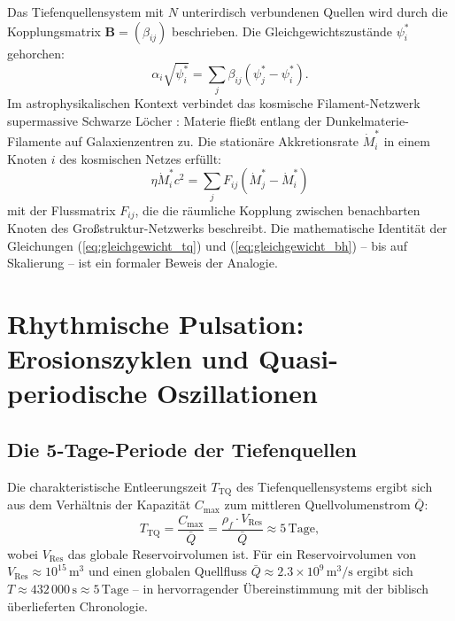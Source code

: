 ﻿\documentclass[12pt,a4paper]{report}
\begin{document}
Das Tiefenquellensystem mit $N$ unterirdisch verbundenen Quellen wird durch die Kopplungsmatrix $\mathbf{B} = (\beta_{ij})$ beschrieben. Die Gleichgewichtszustände $\psi_i^*$ gehorchen:
\begin{equation}
	\alpha_i \sqrt{\psi_i^*} = \sum_j \beta_{ij}(\psi_j^* - \psi_i^*).
	\label{eq:gleichgewicht_tq}
\end{equation}
Im astrophysikalischen Kontext verbindet das kosmische Filament-Netzwerk supermassive Schwarze Löcher \cite{bond1996,kormendy2013}: Materie fließt entlang der Dunkelmaterie-Filamente auf Galaxienzentren zu. Die stationäre Akkretionsrate $\dot{M}_i^*$ in einem Knoten $i$ des kosmischen Netzes erfüllt:
\begin{equation}
	\eta \dot{M}_i^* c^2 = \sum_j F_{ij}(\dot{M}_j^* - \dot{M}_i^*)
	\label{eq:gleichgewicht_bh}
\end{equation}
mit der Flussmatrix $F_{ij}$, die die räumliche Kopplung zwischen benachbarten Knoten des Großstruktur-Netzwerks beschreibt. Die mathematische Identität der Gleichungen (\ref{eq:gleichgewicht_tq}) und (\ref{eq:gleichgewicht_bh}) -- bis auf Skalierung -- ist ein formaler Beweis der Analogie.

\section{Rhythmische Pulsation: Erosionszyklen und Qua\-si-periodische Oszillationen}

\subsection{Die 5-Tage-Periode der Tiefenquellen}

Die charakteristische Entleerungszeit $T_{\mathrm{TQ}}$ des Tiefenquellensystems ergibt sich aus dem Verhältnis der Kapazität $C_{\max}$ zum mittleren Quellvolumenstrom $\bar{Q}$:
\begin{equation}
	T_{\mathrm{TQ}} = \frac{C_{\max}}{\bar{Q}} = \frac{\rho_f \cdot V_{\mathrm{Res}}}{\bar{Q}} \approx 5\,\mathrm{Tage},
	\label{eq:tperiod_tq}
\end{equation}
wobei $V_{\mathrm{Res}}$ das globale Reservoirvolumen ist. Für ein Reservoirvolumen von $V_{\mathrm{Res}} \approx 10^{15}\,\mathrm{m^3}$ und einen globalen Quellfluss $\bar{Q} \approx 2.3 \times 10^9\,\mathrm{m^3/s}$ ergibt sich $T \approx 432\,000\,\mathrm{s} \approx 5\,\mathrm{Tage}$ -- in hervorragender Übereinstimmung mit der biblisch überlieferten Chronologie.
\end{document}
